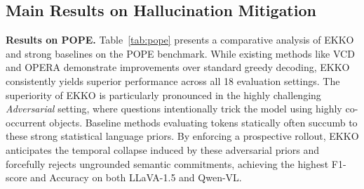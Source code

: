 \subsection{Main Results on Hallucination Mitigation}

\noindent\textbf{Results on POPE.} Table~\ref{tab:pope} presents a comparative analysis of EKKO and strong baselines on the POPE benchmark. While existing methods like VCD and OPERA demonstrate improvements over standard greedy decoding, EKKO consistently yields superior performance across all 18 evaluation settings. The superiority of EKKO is particularly pronounced in the highly challenging \textit{Adversarial} setting, where questions intentionally trick the model using highly co-occurrent objects. Baseline methods evaluating tokens statically often succumb to these strong statistical language priors. By enforcing a prospective rollout, EKKO anticipates the temporal collapse induced by these adversarial priors and forcefully rejects ungrounded semantic commitments, achieving the highest F1-score and Accuracy on both LLaVA-1.5 and Qwen-VL.

